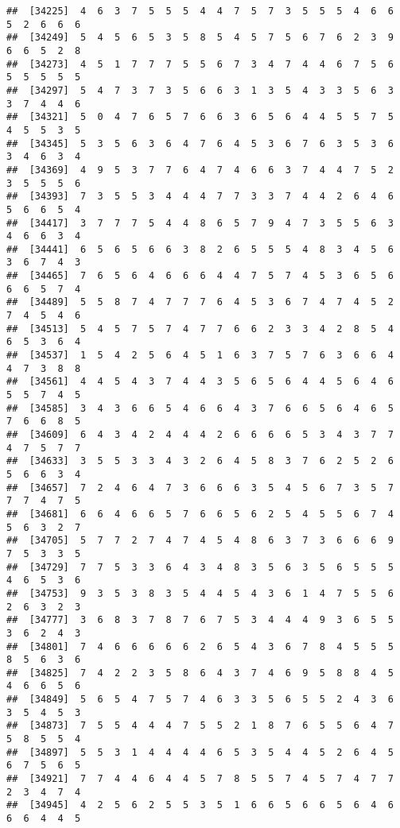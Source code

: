 \documentclass[
]{book}
\begin{document}
\begin{verbatim}
##  [34225]  4  6  3  7  5  5  5  4  4  7  5  7  3  5  5  5  4  6  6  5  2  6  6  6
##  [34249]  5  4  5  6  5  3  5  8  5  4  5  7  5  6  7  6  2  3  9  6  6  5  2  8
##  [34273]  4  5  1  7  7  7  5  5  6  7  3  4  7  4  4  6  7  5  6  5  5  5  5  5
##  [34297]  5  4  7  3  7  3  5  6  6  3  1  3  5  4  3  3  5  6  3  3  7  4  4  6
##  [34321]  5  0  4  7  6  5  7  6  6  3  6  5  6  4  4  5  5  7  5  4  5  5  3  5
##  [34345]  5  3  5  6  3  6  4  7  6  4  5  3  6  7  6  3  5  3  6  3  4  6  3  4
##  [34369]  4  9  5  3  7  7  6  4  7  4  6  6  3  7  4  4  7  5  2  3  5  5  5  6
##  [34393]  7  3  5  5  3  4  4  4  7  7  3  3  7  4  4  2  6  4  6  5  6  6  5  4
##  [34417]  3  7  7  7  5  4  4  8  6  5  7  9  4  7  3  5  5  6  3  4  6  6  3  4
##  [34441]  6  5  6  5  6  6  3  8  2  6  5  5  5  4  8  3  4  5  6  3  6  7  4  3
##  [34465]  7  6  5  6  4  6  6  6  4  4  7  5  7  4  5  3  6  5  6  6  6  5  7  4
##  [34489]  5  5  8  7  4  7  7  7  6  4  5  3  6  7  4  7  4  5  2  7  4  5  4  6
##  [34513]  5  4  5  7  5  7  4  7  7  6  6  2  3  3  4  2  8  5  4  6  5  3  6  4
##  [34537]  1  5  4  2  5  6  4  5  1  6  3  7  5  7  6  3  6  6  4  4  7  3  8  8
##  [34561]  4  4  5  4  3  7  4  4  3  5  6  5  6  4  4  5  6  4  6  5  5  7  4  5
##  [34585]  3  4  3  6  6  5  4  6  6  4  3  7  6  6  5  6  4  6  5  7  6  6  8  5
##  [34609]  6  4  3  4  2  4  4  4  2  6  6  6  6  5  3  4  3  7  7  4  7  5  7  7
##  [34633]  3  5  5  3  3  4  3  2  6  4  5  8  3  7  6  2  5  2  6  5  6  6  3  4
##  [34657]  7  2  4  6  4  7  3  6  6  6  3  5  4  5  6  7  3  5  7  7  7  4  7  5
##  [34681]  6  6  4  6  6  5  7  6  6  5  6  2  5  4  5  5  6  7  4  5  6  3  2  7
##  [34705]  5  7  7  2  7  4  7  4  5  4  8  6  3  7  3  6  6  6  9  7  5  3  3  5
##  [34729]  7  7  5  3  3  6  4  3  4  8  3  5  6  3  5  6  5  5  5  4  6  5  3  6
##  [34753]  9  3  5  3  8  3  5  4  4  5  4  3  6  1  4  7  5  5  6  2  6  3  2  3
##  [34777]  3  6  8  3  7  8  7  6  7  5  3  4  4  4  9  3  6  5  5  3  6  2  4  3
##  [34801]  7  4  6  6  6  6  6  2  6  5  4  3  6  7  8  4  5  5  5  8  5  6  3  6
##  [34825]  7  4  2  2  3  5  8  6  4  3  7  4  6  9  5  8  8  4  5  4  6  6  5  6
##  [34849]  5  6  5  4  7  5  7  4  6  3  3  5  6  5  5  2  4  3  6  3  5  4  5  3
##  [34873]  7  5  5  4  4  4  7  5  5  2  1  8  7  6  5  5  6  4  7  5  8  5  5  4
##  [34897]  5  5  3  1  4  4  4  4  6  5  3  5  4  4  5  2  6  4  5  6  7  5  6  5
##  [34921]  7  7  4  4  6  4  4  5  7  8  5  5  7  4  5  7  4  7  7  2  3  4  7  4
##  [34945]  4  2  5  6  2  5  5  3  5  1  6  6  5  6  6  5  6  4  6  6  6  4  4  5

\end{verbatim}
\end{document}
